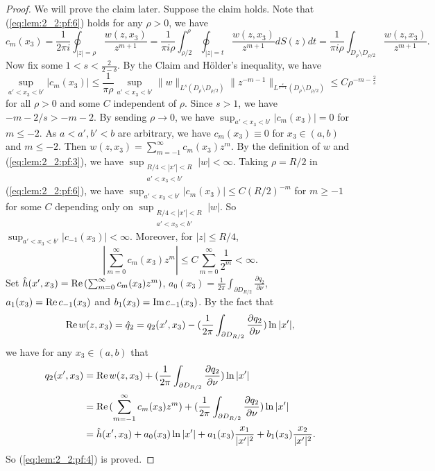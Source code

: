 \documentclass[12pt]{article}
\newcommand{\Real}{{\rm Re \hspace{0.05cm} }}
\newcommand{\Imagine}{{\rm Im \hspace{0.05cm} }}
\begin{document}
\begin{proof}
	We will prove the claim later. Suppose the claim holds. Note that (\ref{eq:lem:2_2:pf:6}) holds for any $\rho>0$, we have
	\[
		c_{m}(x_3)=\frac{1}{2\pi i}\oint_{|z|=\rho} \frac{w(z, x_3)}{z^{m+1}}=\frac{1}{\pi i \rho}\int_{\rho/2}^{\rho}\oint_{|z|=t} \frac{w(z, x_3)}{z^{m+1}}dS(z)dt=\frac{1}{\pi i \rho}\int_{D_{\rho}\setminus D_{\rho/2}}\frac{w(z, x_3)}{z^{m+1}}.
	\]
	Now fix some $1<s<\frac{2}{2-\delta}$. By the Claim and H\"{o}lder's inequality, we have
	\[
		\sup_{a'<x_3<b'}|c_{m}(x_3)|\le \frac{1}{\pi\rho}\sup_{a'<x_3<b'}\|w\|_{L^s(D_{\rho}\setminus D_{\rho/2})}\|z^{-m-1}\|_{L^{\frac{s}{s-1}}(D_{\rho}\setminus D_{\rho/2})} 
		\le C\rho^{-m-\frac{2}{s}}
	\]
	for all $\rho>0$ and some $C$ independent of $\rho$. 
	Since $s>1$, we have $-m-2/s>-m-2$. By sending $\rho\to 0$, we have $\sup_{a'<x_3<b'}|c_m(x_3)|=0$ for $m\le -2$. As $a<a', b'<b$ are arbitrary, we have $c_m(x_3)\equiv 0$ for $x_3\in (a, b)$ and $m\le -2$. Then $w(z, x_3)=\sum_{m=-1}^{\infty}c_m(x_3)z^m$. By the definition of $w$ and (\ref{eq:lem:2_2:pf:3}), we have $\sup_{\substack{R/4<|x'|<R \\ a'<x_3<b'}}|w|<\infty$. Taking $\rho=R/2$ in (\ref{eq:lem:2_2:pf:6}), we have $\sup_{a'<x_3<b'}|c_m(x_3)|\le C(R/2)^{-m}$ for $m\ge -1$ for some $C$ depending only on $\sup_{\substack{R/4<|x'|<R \\ a'<x_3<b'}}|w|$. So $\sup_{a'<x_3<b'}|c_{-1}(x_3)|<\infty$. Moreover, for $|z|\le R/4$, 
	\begin{equation}\label{eq:lem:2_2:pf:7}
		| \sum_{m=0}^{\infty} c_m(x_3) z^m | \le C \sum_{m=0}^{\infty} \frac{1}{2^m}<\infty. 
	\end{equation}
	Set $\hat{h}(x', x_3)=\Real (\sum_{m=0}^{\infty}c_m(x_3)z^m)$, $a_0(x_3)=\frac{1}{2\pi}\int_{\partial D_{R/2}}\frac{\partial q_2}{\partial \nu}$, $a_1(x_3)=\Real c_{-1}(x_3)$ and $b_1(x_3)=\Imagine c_{-1}(x_3)$. By the fact that 
	\[
		\Real w(z, x_3)=\hat{q}_2=q_2(x', x_3)-(\frac{1}{2\pi}\int_{\partial D_{R/2}}\frac{\partial q_2}{\partial \nu})\ln |x'|, 
	\]
	we have for any $x_3\in(a,b)$ that
	\[
	\begin{split}
		q_2(x', x_3) & =\Real w(z, x_3)+(\frac{1}{2\pi}\int_{\partial D_{R/2}}\frac{\partial q_2}{\partial \nu})\ln |x'|\\
		& =\Real (\sum_{m=-1}^{\infty}c_m(x_3)z^m)+(\frac{1}{2\pi}\int_{\partial D_{R/2}}\frac{\partial q_2}{\partial \nu})\ln |x'|\\
		& =\hat{h}(x', x_3)+
		a_0(x_3)\ln |x'|+a_1(x_3)\frac{x_1}{|x'|^2}+b_1(x_3)\frac{x_2}{|x'|^2}. 
		\end{split}
	\]
	So (\ref{eq:lem:2_2:pf:4}) is proved. 
	

\end{proof}
\end{document}
